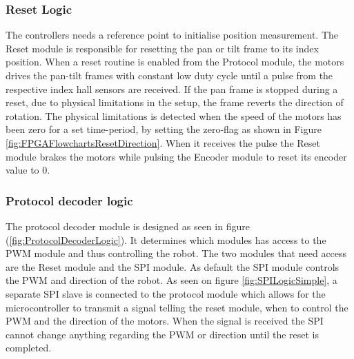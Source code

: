 \documentclass[../../main.tex]{subfiles}
\begin{document}
\subsubsection*{Reset Logic}
The controllers needs a reference point to initialise position measurement.
The Reset module is responsible for resetting the pan or tilt frame to its index position. When a reset routine is enabled from the Protocol module, the motors drives the pan-tilt frames with constant low duty cycle until a pulse from the respective index hall sensors are received. If the pan frame is stopped during a reset, due to physical limitations in the setup, the frame reverts the direction of rotation. The physical limitations is detected when the speed of the motors has been zero for a set time-period, by setting the zero-flag as shown in Figure \ref{fig:FPGAFlowchartsResetDirection}. When it receives the pulse the Reset module brakes the motors while pulsing the Encoder module to reset its encoder value to 0. 





\subsubsection*{Protocol decoder logic}


The protocol decoder module is designed as seen in figure (\ref{fig:ProtocolDecoderLogic}). It determines which modules has access to the PWM module and thus controlling the robot. The two modules that need access are the Reset module and the SPI module. As default the SPI module controls the PWM and direction of the robot. As seen on figure \ref{fig:SPILogicSimple}, a separate SPI slave is connected to the protocol module which allows for the microcontroller to transmit a signal telling the reset module, when to control the PWM and the direction of the motors. When the signal is received the SPI cannot change anything regarding the PWM or direction until the reset is completed. 
\end{document}
